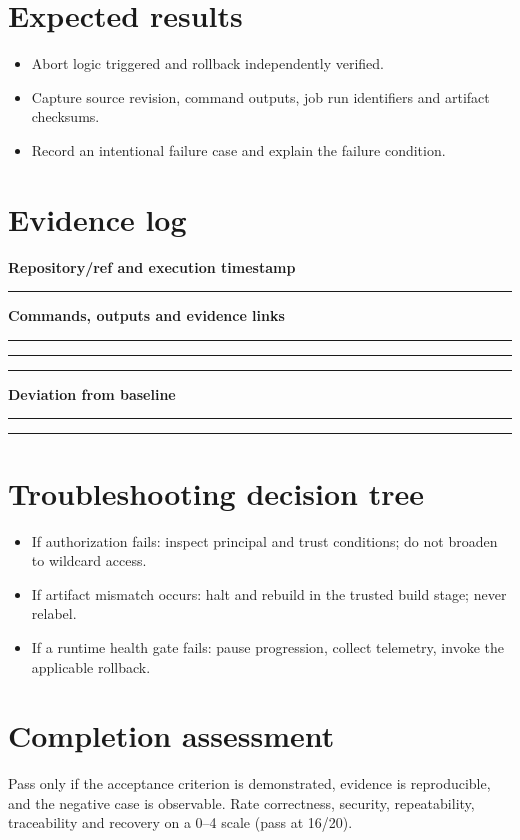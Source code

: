 \documentclass[10pt,letterpaper]{article}
\begin{document}
\section{Expected results}
\begin{itemize}
\item Abort logic triggered and rollback independently verified.
\item Capture source revision, command outputs, job run identifiers and artifact checksums.
\item Record an intentional failure case and explain the failure condition.
\end{itemize}

\section{Evidence log}
\textbf{Repository/ref and execution timestamp}\par
\noindent\rule{\linewidth}{0.35pt}\par\vspace{0.7em}
\textbf{Commands, outputs and evidence links}\par
\noindent\rule{\linewidth}{0.35pt}\par\vspace{0.7em}
\noindent\rule{\linewidth}{0.35pt}\par\vspace{0.7em}
\noindent\rule{\linewidth}{0.35pt}\par\vspace{0.7em}
\textbf{Deviation from baseline}\par
\noindent\rule{\linewidth}{0.35pt}\par\vspace{0.7em}
\noindent\rule{\linewidth}{0.35pt}\par\vspace{0.7em}

\section{Troubleshooting decision tree}
\begin{itemize}
\item If authorization fails: inspect principal and trust conditions; do not broaden to wildcard access.
\item If artifact mismatch occurs: halt and rebuild in the trusted build stage; never relabel.
\item If a runtime health gate fails: pause progression, collect telemetry, invoke the applicable rollback.
\end{itemize}

\section{Completion assessment}
Pass only if the acceptance criterion is demonstrated, evidence is reproducible, and the negative case is observable. Rate correctness, security, repeatability, traceability and recovery on a 0--4 scale (pass at 16/20).
\end{document}
